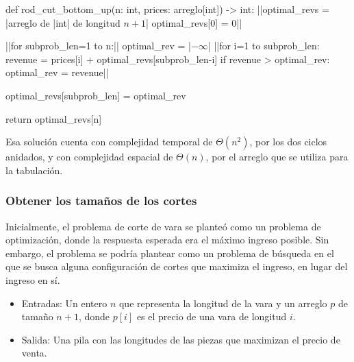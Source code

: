 \begin{pseudocode}
def rod_cut_bottom_up(n: int, prices: arreglo[int]) -> int:
    ||optimal_revs = |\textrm{arreglo de }|int|\textrm{ de longitud $n+1$}|
    optimal_revs[0] = 0||

    ||for subprob_len=1 to n:||
        optimal_rev = |$-\infty$|
        ||for i=1 to subprob_len:
            revenue = prices[i] + optimal_revs[subprob_len-i]
            if revenue > optimal_rev:
                optimal_rev = revenue||
            
        optimal_revs[subprob_len] = optimal_rev
    
    return optimal_revs[n]
\end{pseudocode}
\begin{annotations}
\end{annotations}

Esa solución cuenta con complejidad temporal de $\Theta(n^2)$, por los dos ciclos anidados, y con complejidad espacial de $\Theta(n)$, por el arreglo que se utiliza para la tabulación.

\subsubsection{Obtener los tamaños de los cortes}

Inicialmente, el problema de corte de vara se planteó como un problema de optimización, donde la respuesta esperada era el máximo ingreso posible. Sin embargo, el problema se podría plantear como un problema de búsqueda en el que se busca alguna configuración de cortes que maximiza el ingreso, en lugar del ingreso en sí.
\begin{itemize}
  \item Entradas: Un entero $n$ que representa la longitud de la vara y un arreglo $p$ de tamaño $n+1$, donde $p[i]$ es el precio de una vara de longitud $i$.
  \item Salida: Una pila con las longitudes de las piezas que maximizan el precio de venta.
\end{itemize}

